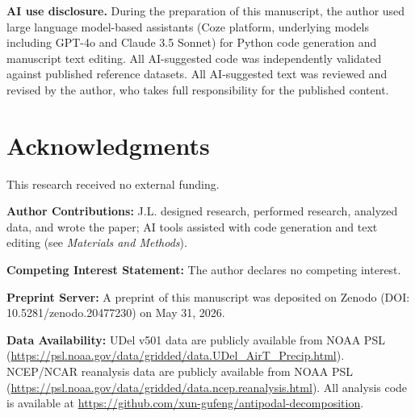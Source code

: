 \documentclass[9pt,twocolumn]{article}
\begin{document}
\textbf{AI use disclosure.} During the preparation of this manuscript, the author used large language model-based assistants (Coze platform, underlying models including GPT-4o and Claude 3.5 Sonnet) for Python code generation and manuscript text editing. All AI-suggested code was independently validated against published reference datasets. All AI-suggested text was reviewed and revised by the author, who takes full responsibility for the published content.

\section*{Acknowledgments}

This research received no external funding.

\vspace{6pt}
\noindent\textbf{Author Contributions:} J.L. designed research, performed research, analyzed data, and wrote the paper; AI tools assisted with code generation and text editing (see \textit{Materials and Methods}).

\noindent\textbf{Competing Interest Statement:} The author declares no competing interest.

\noindent\textbf{Preprint Server:} A preprint of this manuscript was deposited on Zenodo (DOI: 10.5281/zenodo.20477230) on May 31, 2026.

\noindent\textbf{Data Availability:} UDel v501 data are publicly available from NOAA PSL (\url{https://psl.noaa.gov/data/gridded/data.UDel_AirT_Precip.html}). NCEP/NCAR reanalysis data are publicly available from NOAA PSL (\url{https://psl.noaa.gov/data/gridded/data.ncep.reanalysis.html}). All analysis code is available at \url{https://github.com/xun-gufeng/antipodal-decomposition}.
\end{document}
